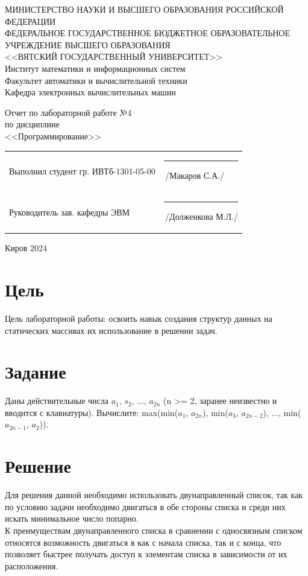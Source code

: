 \documentclass[a4paper,14pt]{extarticle}
\begin{document}
	\newpage\thispagestyle{empty}
	\begin{center}
		\MakeUppercase{
			Министерство науки и высшего образования Российской Федерации\\
			Федеральное государственное бюджетное образовательное учреждение высшего образования\\
			<<Вятский Государственный Университет>>\\
		}
		Институт математики и информационных систем\\
		Факультет автоматики и вычислительной техники\\
		Кафедра электронных вычислительных машин
	\end{center}
	\vfill
	
	\begin{center}
		Отчет по лабораторной работе №4\\
		по дисциплине\\
		<<Программирование>>\\
	\end{center}
	\vfill
	
	\noindent
	\begin{tabular}{ll}
		Выполнил студент гр. ИВТб-1301-05-00 \hspace{5mm} &
		\rule[-1mm]{25mm}{0.10mm}\,/Макаров С.А./\\
		
		Руководитель зав. кафедры ЭВМ & \rule[-1mm]{25mm}{0.10mm}\,/Долженкова М.Л./\\
	\end{tabular}
	
	\vfill
	\begin{center}
		Киров 2024
	\end{center}
	
	\newpage
	\section*{Цель}
	Цель лабораторной работы: освоить навык создания структур данных на статических массивах их использование в решении задач.
	
	\section*{Задание}
	Даны действительные числа $a_1$, $s_2$, ..., $a_{2n}$ (n >= 2, заранее неизвестно и вводится с клавиатуры). Вычислите: max(min($a_1$, $a_{2n}$), min($a_3$, $a_{2n-2}$), ..., min($a_{2n-1}$, $a_2$)).
	
	\section*{Решение}
	Для решения данной необходимо использовать двунаправленный список, так как по условию задачи необходимо двигаться в обе стороны списка и среди них искать минимальное число попарно.\\
	\indent К преимуществам двунаправленного списка в сравнении с односвязным списком относятся возможность двигаться в как с начала списка, так и с конца, что позволяет быстрее получать доступ к элементам списка в зависимости от их расположения.\\
	
\end{document}
